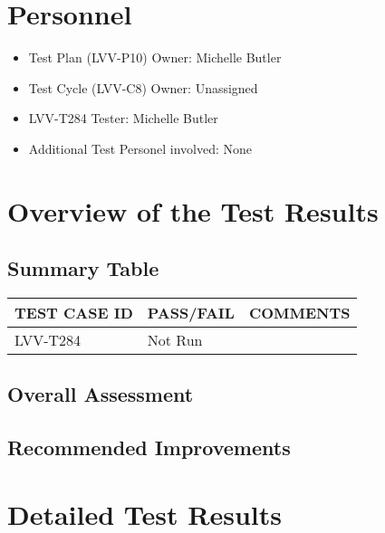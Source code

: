 \documentclass[DM,lsstdraft,STR,toc]{lsstdoc}
\begin{document}
\section{Personnel}
\label{sect:personnel}

\begin{itemize}
\item Test Plan (LVV-P10) Owner: Michelle Butler
\item Test Cycle (LVV-C8) Owner: Unassigned
\item LVV-T284 Tester: Michelle Butler
\item Additional Test Personel involved: None 
\end{itemize}

\newpage

\section{Overview of the Test Results}
\label{sect:overview}

\subsection{Summary Table}
\label{sect:summarytable}


\begin{longtable} {|p{}|p{}|p{}|}
\hline
{\bf TEST CASE ID} & {\bf PASS/FAIL} & {\bf COMMENTS} \\\hline
LVV-T284 & Not Run & \\\hline
\end{longtable}

\subsection{Overall Assessment}
\label{sect:overallassessment}


\subsection{Recommended Improvements}
\label{sect:recommendations}




\newpage

\section{Detailed Test Results}
\label{sect:detailed}
\end{document}
